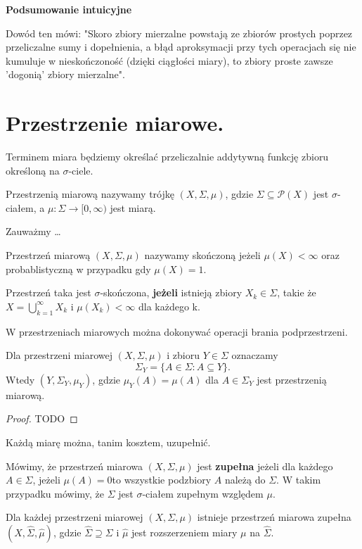 \textbf{Podsumowanie intuicyjne}

Dowód ten mówi: "Skoro zbiory mierzalne powstają ze zbiorów prostych poprzez przeliczalne sumy i dopełnienia, a błąd aproksymacji przy tych operacjach się nie kumuluje w nieskończoność (dzięki ciągłości miary), to zbiory proste zawsze 'dogonią' zbiory mierzalne".

\section{Przestrzenie miarowe.}
Terminem miara będziemy określać przeliczalnie addytywną funkcję zbioru określoną na $\sigma$-ciele.

\begin{definition}
	Przestrzenią miarową nazywamy trójkę $\left( X, \Sigma, \mu \right) $, gdzie $\Sigma \subseteq \mathcal{P}(X) $ jest $\sigma$-ciałem, a $\mu: \Sigma \to [0,\infty)$ jest miarą. 
\end{definition} 
\begin{remark}
	Zauważmy \ldots
\end{remark} 
\begin{definition}
	Przestrzeń miarową $\left(X, \Sigma, \mu \right) $ nazywamy skończoną jeżeli $\mu\left( X \right) < \infty$ oraz probablistyczną w przypadku gdy $\mu\left( X \right) = 1$.

	Przestrzeń taka jest $\sigma$-skończona, \textbf{jeżeli} istnieją zbiory $X_{k} \in \Sigma$, takie że $X=\bigcup_{k=1} ^{\infty} X_{k}$ i $\mu\left( X_{k} \right) < \infty $ dla każdego k.
	
\end{definition} 

W przestrzeniach miarowych można dokonywać operacji brania podprzestrzeni.
\begin{theorem}
	Dla przestrzeni miarowej $\left( X, \Sigma, \mu \right) $ i zbioru $Y \in \Sigma$ oznaczamy
	\[
	\Sigma_{Y}= \{A \in \Sigma: A \subseteq Y\} 
	.\] 
	Wtedy $\left( Y, \Sigma_{Y}, \mu_{Y} \right)$, gdzie $\mu_{Y}\left( A \right) = \mu\left( A \right) $ dla $A\in \Sigma_{Y}$ jest przestrzenią miarową. 
\end{theorem} 
\begin{proof}
	TODO
\end{proof} 
Każdą miarę można, tanim kosztem, uzupełnić.
\begin{definition}
	Mówimy, że przestrzeń miarowa $\left( X,\Sigma,\mu \right) $ jest \textbf{zupełna} jeżeli dla każdego $A\in \Sigma$, jeżeli $\mu\left( A \right)= 0 $to wszystkie podzbiory $A$ należą do $\Sigma$. W takim przypadku mówimy, że $\Sigma$ jest  $\sigma$-ciałem zupełnym względem $\mu$.
\end{definition} 
\begin{theorem}
	Dla każdej przestrzeni miarowej $\left( X,\Sigma, \mu \right) $ istnieje przestrzeń miarowa zupełna $\left( X, \hat{\Sigma}, \hat{\mu} \right) $, gdzie $\hat{\Sigma}\supseteq \Sigma$ i $\hat{\mu}$ jest rozszerzeniem miary  $\mu$ na $\hat{\Sigma}.$
\end{theorem} 
